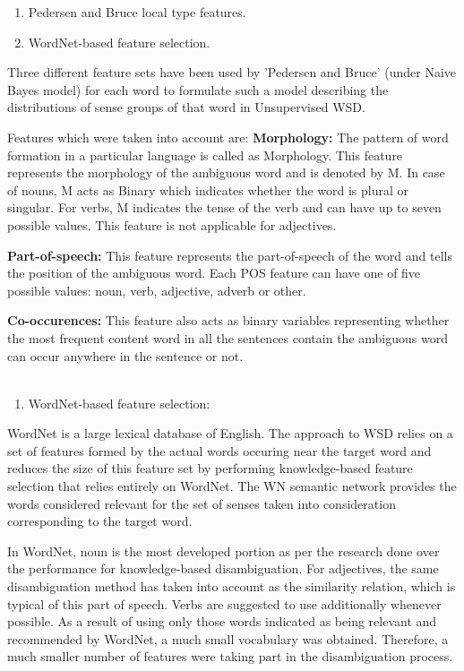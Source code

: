\begin{enumerate}
	\item Pedersen and Bruce local type features.
	\item WordNet-based feature selection.
\end{enumerate}

Three different feature sets have been used by 'Pedersen and Bruce' (under Naive Bayes model) for each word to formulate such a model describing the distributions of sense groups of that word in Unsupervised WSD.

Features which were taken into account are:
\textbf{Morphology:} The pattern of word formation in a particular language is called as Morphology. This feature represents the morphology \cite{5494927} of the ambiguous word and is denoted by M. 
In case of nouns, M acts as Binary which indicates whether the word is plural or singular. For verbs, M indicates the tense of the verb and can have up to seven possible values. This feature is not applicable for adjectives.

\textbf{Part-of-speech:} This feature represents the part-of-speech \cite{6982457} of the word and tells the position of the ambiguous word. Each POS feature can have one of five possible values: noun, verb, adjective, adverb or other.

\textbf{Co-occurences:} This feature also acts as binary variables representing whether the most frequent content word in all the sentences contain the ambiguous word can occur anywhere in the sentence or not.\\\\

\begin{enumerate}
	\item WordNet-based feature selection:
\end{enumerate}

WordNet is a large lexical database of English. The approach to WSD relies on a set of features formed by the actual words occuring near the target word and reduces the size of this feature set by performing knowledge-based feature selection that relies entirely on WordNet.
The WN semantic network provides the words considered relevant for the set of senses taken into consideration corresponding to the target word.

In WordNet, noun is the most developed portion as per the research done over the performance for knowledge-based disambiguation.
For adjectives, the same disambiguation method has taken into account as the similarity relation, which  is typical of this part of speech.
Verbs are suggested to use additionally whenever possible. As a result of using only those words indicated as being relevant and recommended by WordNet, a much small vocabulary was obtained. Therefore, a much smaller number of features were taking part in the disambiguation process.

